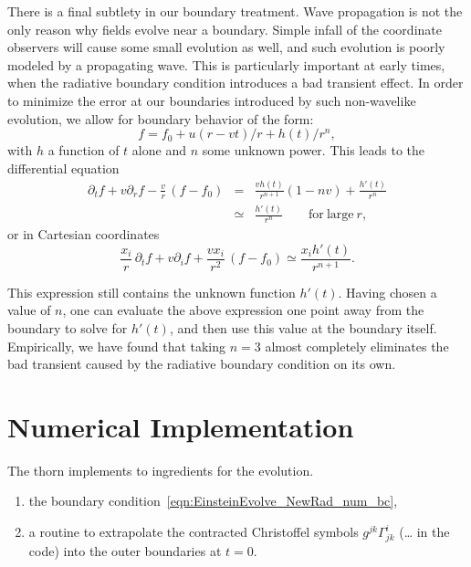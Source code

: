 There is a final subtlety in our boundary treatment.  Wave propagation
is not the only reason why fields evolve near a boundary.  Simple
infall of the coordinate observers will cause some small evolution as
well, and such evolution is poorly modeled by a propagating wave. This
is particularly important at early times, when the radiative boundary
condition introduces a bad transient effect. In order to minimize the
error at our boundaries introduced by such non-wavelike evolution, we
allow for boundary behavior of the form:
\begin{equation}
f = f_0 + u(r-vt)/r + h(t)/r^n ,
\label{eq:radpower}
\end{equation}
with $h$ a function of $t$ alone and $n$ some unknown power. This
leads to the differential equation
\begin{eqnarray}
\partial_t f + v \partial_r f
- \frac{v}{r} \, (f - f_0) &=&
\frac{v h(t)}{r^{n+1}} \left( 1 - n v \right)
+ \frac{h'(t)}{r^n} \nonumber \\
&\simeq& \frac{h'(t)}{r^n} \qquad \mathrm{for\ large\ } r ,
\end{eqnarray}
or in Cartesian coordinates
\begin{equation}
\frac{x_i}{r} \, \partial_t f + v \partial_i f + \frac{v x_i}{r^2} \,
\left( f - f_0 \right) \simeq \frac{x_i h'(t)}{r^{n+1}} .
\label{eqn:EinsteinEvolve_NewRad_num_bc}
\end{equation}

This expression still contains the unknown function $h'(t)$. Having
chosen a value of $n$, one can evaluate the above expression one point
away from the boundary to solve for $h'(t)$, and then use this value
at the boundary itself.  Empirically, we have found that taking $n=3$
almost completely eliminates the bad transient caused by the radiative
boundary condition on its own.

\section{Numerical Implementation}
The thorn implements to ingredients for the evolution. 
\begin{enumerate}
\item the boundary condition~\eqref{eqn:EinsteinEvolve_NewRad_num_bc},
\item a routine to extrapolate the contracted Christoffel symbols
$g^{jk} \Gamma^i_{jk}$ (\ldots{} in the code) into the
outer boundaries at $t=0$.
\end{enumerate}

